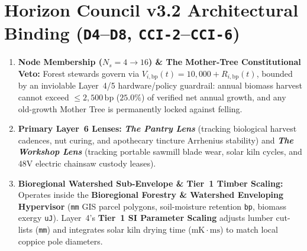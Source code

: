\section{Horizon Council v3.2 Architectural Binding (\texttt{D4}--\texttt{D8}, \texttt{CCI-2}--\texttt{CCI-6})}
\begin{enumerate}
    \item \textbf{Node Membership ($N_s = 4 \to 16$) \& The Mother-Tree Constitutional Veto:} Forest stewards govern via $V_{i,\mathrm{bp}}(t) = 10{,}000 + R_{i,\mathrm{bp}}(t)$, bounded by an inviolable Layer~4/5 hardware/policy guardrail: annual biomass harvest cannot exceed $\le 2{,}500\,\mathrm{bp}$ ($25.0\%$) of verified net annual growth, and any old-growth Mother Tree is permanently locked against felling.
    \item \textbf{Primary Layer~6 Lenses:} \textbf{\textit{The Pantry Lens}} (tracking biological harvest cadences, nut curing, and apothecary tincture Arrhenius stability) and \textbf{\textit{The Workshop Lens}} (tracking portable sawmill blade wear, solar kiln cycles, and 48V electric chainsaw custody leases).
    \item \textbf{Bioregional Watershed Sub-Envelope \& Tier~1 Timber Scaling:} Operates inside the \textbf{Bioregional Forestry \& Watershed Enveloping Hypervisor} (\texttt{mm} GIS parcel polygons, soil-moisture retention \texttt{bp}, biomass exergy \texttt{uJ}). Layer~4's \textbf{Tier~1 SI Parameter Scaling} adjusts lumber cut-lists (\texttt{mm}) and integrates solar kiln drying time ($\mathrm{mK \cdot ms}$) to match local coppice pole diameters.
\end{enumerate}

